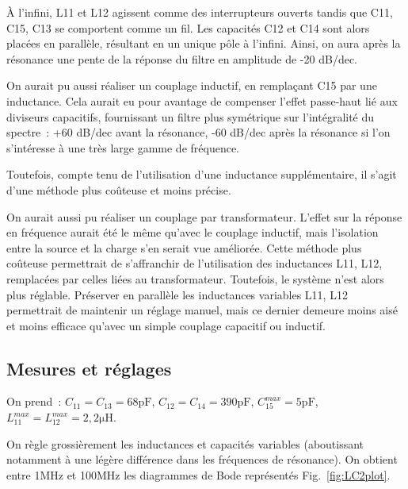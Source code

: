 \documentclass{article}
\begin{document}
À l'infini, L11 et L12 agissent comme des interrupteurs ouverts tandis que C11, C15, C13 se comportent comme un fil. Les capacités C12 et C14 sont alors placées en parallèle, résultant en un unique pôle à l'infini. Ainsi, on aura après la résonance une pente de la réponse du filtre en amplitude de -20 dB/dec.



On aurait pu aussi réaliser un couplage inductif, en remplaçant C15 par une inductance. Cela aurait eu pour avantage de compenser l'effet passe-haut lié aux diviseurs capacitifs, fournissant un filtre plus symétrique sur l'intégralité du spectre~: +60 dB/dec avant la résonance, -60 dB/dec après la résonance si l'on s'intéresse à une très large gamme de fréquence.


Toutefois, compte tenu de l'utilisation d'une inductance supplémentaire, il s'agit d'une méthode plus coûteuse et moins précise.

On aurait aussi pu réaliser un couplage par transformateur. L'effet sur la réponse en fréquence aurait été le même qu'avec le couplage inductif, mais l'isolation entre la source et la charge s'en serait vue améliorée. Cette méthode plus coûteuse permettrait de s'affranchir de l'utilisation des inductances L11, L12, remplacées par celles liées au transformateur. Toutefois, le système n'est alors plus réglable. Préserver en parallèle les inductances variables L11, L12 permettrait de maintenir un réglage manuel, mais ce dernier demeure moins aisé et moins efficace qu'avec un simple couplage capacitif ou inductif.





\subsection{Mesures et réglages}


On prend~: $C_{11}=C_{13}=68\mathrm{pF}$, $C_{12}=C_{14}=390\mathrm{pF}$, $C_{15}^{max}=5\mathrm{pF}$, $L_{11}^{max}=L_{12}^{max}=2,2\mathrm{\mu H}$.

On règle grossièrement les inductances et capacités variables (aboutissant notamment à une légère différence dans les fréquences de résonance). On obtient entre 1MHz et 100MHz les diagrammes de Bode représentés Fig.~\ref{fig:LC2plot}.
\end{document}
